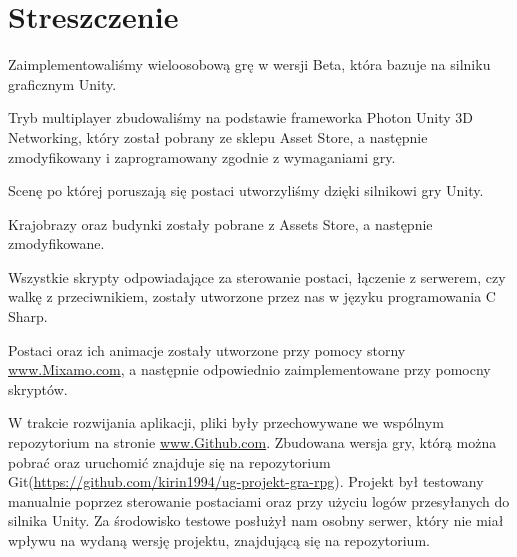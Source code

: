 \section{Streszczenie}
		Zaimplementowaliśmy wieloosobową grę w wersji Beta, która bazuje na silniku graficznym Unity.
 
Tryb multiplayer zbudowaliśmy na podstawie frameworka Photon Unity 3D Networking, który został pobrany ze sklepu Asset Store, a następnie zmodyfikowany i zaprogramowany zgodnie z wymaganiami gry.

Scenę po której poruszają się postaci utworzyliśmy dzięki silnikowi gry Unity.

Krajobrazy oraz budynki zostały pobrane z Assets Store, a następnie zmodyfikowane.

Wszystkie skrypty odpowiadające za sterowanie postaci, łączenie z serwerem, czy walkę z przeciwnikiem, zostały utworzone przez nas w języku programowania C Sharp.

Postaci oraz ich animacje zostały utworzone przy pomocy storny \url{www.Mixamo.com}, a następnie odpowiednio zaimplementowane przy pomocny skryptów.

W trakcie rozwijania aplikacji, pliki były przechowywane we wspólnym repozytorium na stronie \url{www.Github.com}. Zbudowana wersja gry, którą można pobrać oraz uruchomić znajduje się na repozytorium Git(\url{https://github.com/kirin1994/ug-projekt-gra-rpg}).
Projekt był testowany manualnie poprzez sterowanie postaciami oraz przy użyciu logów przesyłanych do silnika Unity.
Za środowisko testowe posłużył nam osobny serwer, który nie miał wpływu na wydaną wersję projektu, znajdującą się na repozytorium.
